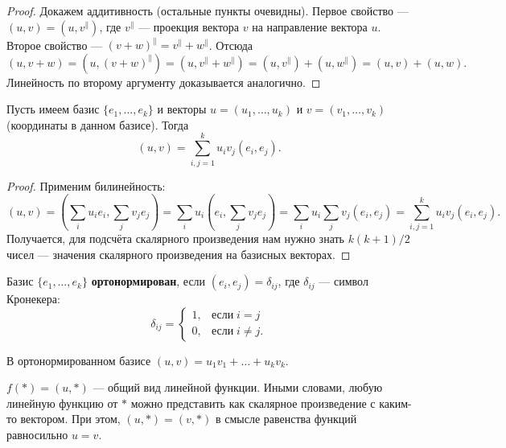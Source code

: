 \begin{proof}
    Докажем аддитивность (остальные пункты очевидны). Первое свойство --- $(u, v) = (u, v^\parallel)$, где $v^\parallel$ --- проекция вектора $v$ на направление вектора $u$. Второе свойство --- $(v + w)^\parallel = v^\parallel + w^\parallel$. Отсюда
    $$
    (u, v + w) = (u, (v + w)^\parallel) = (u, v^\parallel + w^\parallel) = (u, v^\parallel) + (u, w^\parallel) = (u, v) + (u, w).
    $$
    Линейность по второму аргументу доказывается аналогично.
\end{proof}

\begin{statement}
    Пусть имеем базис $\{e_1, \ldots, e_k\}$ и векторы $u = (u_1, \ldots, u_k)$ и $v = (v_1, \ldots, v_k)$ (координаты в данном базисе). Тогда
    $$(u, v) = \sum_{i, j = 1}^k u_iv_j(e_i, e_j). $$
\end{statement}

\begin{proof}
    Применим билинейность:
    $$
    (u, v) = \left(\sum_iu_ie_i, \sum_jv_je_j\right) = \sum_iu_i\left(e_i, \sum_jv_je_j\right) = \sum_iu_i\sum_jv_j(e_i, e_j) = \sum_{i, j = 1}^ku_iv_j(e_i, e_j).
    $$
    Получается, для подсчёта скалярного произведения нам нужно знать $k(k + 1) / 2$ чисел --- значения скалярного произведения на базисных векторах.
\end{proof}

\begin{definition}
    Базис $\{e_1, \ldots, e_k\}$ \textbf{ортонормирован}\footnotemark, если $(e_i, e_j) = \delta_{ij}$, где $\delta_{ij}$ --- символ Кронекера:
    $$\delta_{ij} = 
    \begin{cases}
        1,&\text{если}\;i = j\\
        0,&\text{если}\;i \ne j.
    \end{cases}$$
\end{definition}


\begin{remark}
    В ортонормированном базисе $(u, v) = u_1v_1 + \ldots + u_kv_k$.
\end{remark}

\begin{theorem}
    $f(\ast) = (u, \ast)$ --- общий вид линейной функции. Иными словами, любую линейную функцию от $\ast$ можно представить как скалярное произведение с каким-то вектором. При этом, $(u, \ast) = (v, \ast)$ в смысле равенства функций равносильно $u = v$.
\end{theorem}

